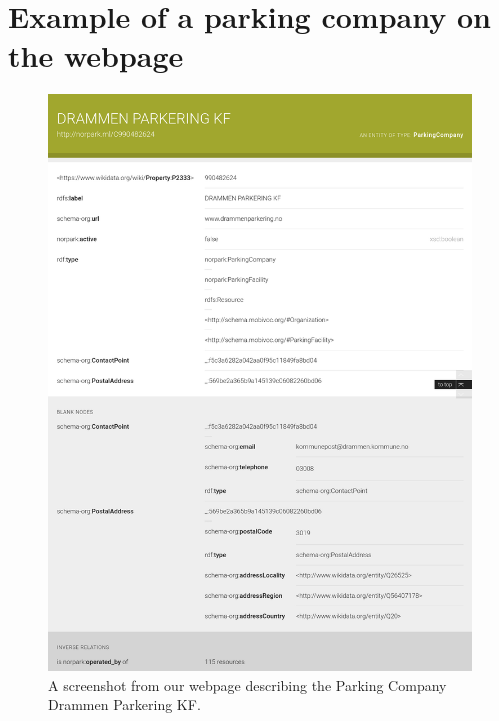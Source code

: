 \chapter{Example of a parking company on the webpage}
\label{appendix:webpage}
\begin{figure}[H]
	\centering
	\includegraphics[scale=0.22]{figures/parking-company-screenshot.png}
	\caption{A screenshot from our webpage describing the Parking Company Drammen Parkering KF.}
\end{figure}

